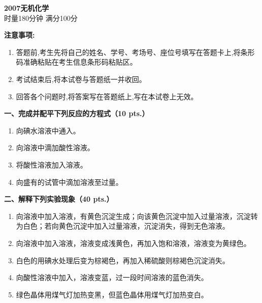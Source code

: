 \begin{center}
    {\LARGE \textbf{2007无机化学}} \\[2ex]
    {\large 时量180分钟 \quad 满分100分}
\end{center}

\vspace{0.5cm}
\noindent\textbf{注意事项:}
\begin{enumerate}[label=\arabic*., parsep=0pt, itemsep=0pt]
    \item 答题前,考生先将自己的姓名、学号、考场号、座位号填写在答题卡上,将条形码准确粘贴在考生信息条形码粘贴区。
    \item 考试结束后,将本试卷与答题纸一并收回。
    \item 回答各个问题时,将答案写在答题纸上,写在本试卷上无效。
\end{enumerate}

\vspace{0.5cm}
\noindent\textbf{一、完成并配平下列反应的方程式（10 pts.）}

\begin{enumerate}[label=\arabic*., start=1, itemsep=1.5ex]
    \item 向碘水溶液中通入。
    \item 向溶液中滴加酸性溶液。
    \item 将酸性溶液加入溶液。
    \item 向盛有的试管中滴加溶液至过量。
\end{enumerate}

\vspace{0.5cm}
\noindent\textbf{二、解释下列实验现象（40 pts.）}

\begin{enumerate}[label=\arabic*., start=1, itemsep=1.5ex]
    \item 向溶液中加入溶液，有黄色沉淀生成；向该黄色沉淀中加入过量溶液，沉淀转为白色；若向黄色沉淀中加入过量溶液，沉淀消失，得到无色溶液。
    \item 向溶液中加入溶液，溶液变成浅黄色，再加入饱和溶液，溶液变为黄绿色。
    \item 白色的用碘水处理后变为棕褐色，再加入稀硫酸则棕褐色沉淀消失。
    \item 向酸性溶液中加入，溶液变蓝，过一段时间溶液的蓝色消失。
    \item 绿色晶体用煤气灯加热变黑，但蓝色晶体用煤气灯加热变白。
\end{enumerate}

